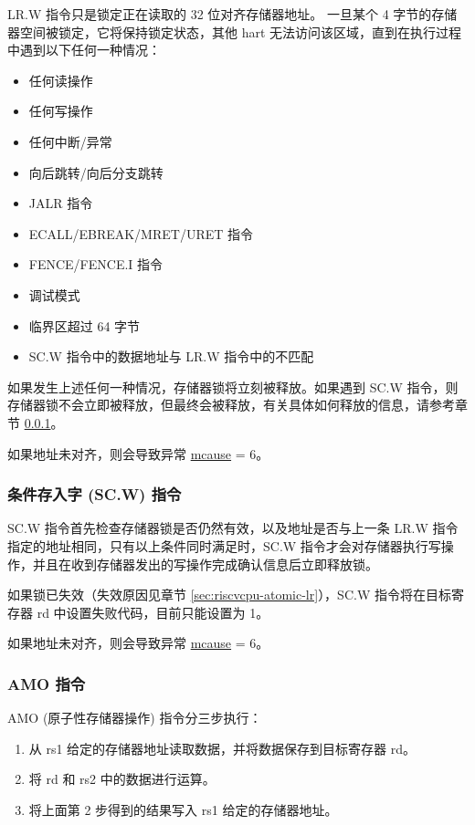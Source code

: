 \documentclass[main\_\_CN.tex]{subfiles}
\begin{document}
LR.W 指令只是锁定正在读取的 32 位对齐存储器地址。 一旦某个 4 字节的存储器空间被锁定，它将保持锁定状态，其他 hart 无法访问该区域，直到在执行过程中遇到以下任何一种情况：

\begin{itemize}
    \item 任何读操作
    \item 任何写操作
    \item 任何中断/异常
    \item 向后跳转/向后分支跳转
    \item JALR 指令
    \item ECALL/EBREAK/MRET/URET 指令
    \item FENCE/FENCE.I 指令
    \item 调试模式
    \item 临界区超过 64 字节
    \item SC.W 指令中的数据地址与 LR.W 指令中的不匹配
\end{itemize}

如果发生上述任何一种情况，存储器锁将立刻被释放。如果遇到 SC.W 指令，则存储器锁不会立即被释放，但最终会被释放，有关具体如何释放的信息，请参考章节 \ref{sec:riscvcpu-atomic-sc}。

如果地址未对齐，则会导致异常 \hyperref[regdesc:MCAUSE]{mcause} = 6。

\subsubsection{条件存入字 (SC.W) 指令}
\label{sec:riscvcpu-atomic-sc}

SC.W 指令首先检查存储器锁是否仍然有效，以及地址是否与上一条 LR.W 指令指定的地址相同，只有以上条件同时满足时，SC.W 指令才会对存储器执行写操作，并且在收到存储器发出的写操作完成确认信息后立即释放锁。

如果锁已失效（失效原因见章节 \ref{sec:riscvcpu-atomic-lr}），SC.W 指令将在目标寄存器 rd 中设置失败代码，目前只能设置为 1。

如果地址未对齐，则会导致异常 \hyperref[regdesc:MCAUSE]{mcause} = 6。

\subsubsection{AMO 指令}
\label{sec:riscvcpu-atomic-amo}

AMO (原子性存储器操作) 指令分三步执行：

\begin{enumerate}
    \item 从 rs1 给定的存储器地址读取数据，并将数据保存到目标寄存器 rd。
    \item 将 rd 和 rs2 中的数据进行运算。
    \item 将上面第 2 步得到的结果写入 rs1 给定的存储器地址。
\end{enumerate}
\end{document}
